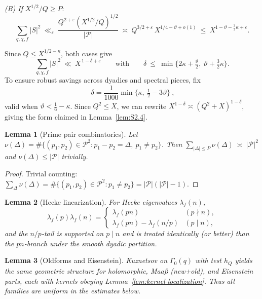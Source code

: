 \documentclass[11pt]{article}
\newtheorem{lemma}{Lemma}[part]
\theoremstyle{definition}
\theoremstyle{remark}
\numberwithin{equation}{part}
\begin{document}
\noindent\emph{(B) If } $X^{1/2}/Q\ge P$:
\[
	\sum_{q,\chi,f}|S|^2\ \ll_\varepsilon\ \frac{Q^{2+\varepsilon}(X^{1/2}/Q)^{1/2}}{|\mathcal P|}
	\ \asymp\ Q^{3/2+\varepsilon}\,X^{1/4-\vartheta+o(1)}
	\ \le\ X^{1-\vartheta-\tfrac{3}{2}\kappa+\varepsilon}.
\]

Since $Q\le X^{1/2-\kappa}$, both cases give
\[
	\sum_{q,\chi,f}|S|^2\ \ll\ X^{\,1-\delta+\varepsilon}
	\qquad\text{with}\qquad
	\delta\ \le\ \min\Big\{2\kappa+\tfrac{\vartheta}{2},\ \vartheta+\tfrac{3}{2}\kappa\Big\}.
\]
To ensure robust savings across dyadics and spectral pieces, fix
\[
	\boxed{\ \delta=\frac{1}{1000}\min\!\Big\{\kappa,\ \tfrac12-3\vartheta\Big\}\ },
\]
valid when $\vartheta<\tfrac16-\kappa$. Since $Q^2\le X$, we can rewrite $X^{1-\delta}\asymp(Q^2+X)^{1-\delta}$, giving the form claimed in Lemma~\ref{lem:S2.4}.


\begin{lemma}[Prime pair combinatorics]\label{lem:prime-pair}
	Let $\nu(\Delta)=\#\{(p_1,p_2)\in\mathcal P^2: p_1-p_2=\Delta,\ p_1\ne p_2\}$. Then
	\(
	\sum_{|\Delta|\le P}\nu(\Delta)\ \asymp\ |\mathcal P|^2
	\)
	and $\nu(\Delta)\le |\mathcal P|$ trivially.
\end{lemma}

\begin{proof}
	Trivial counting: $\sum_{\Delta}\nu(\Delta)=\#\{(p_1,p_2)\in\mathcal P^2: p_1\ne p_2\}=|\mathcal P|(|\mathcal P|-1)$.
\end{proof}

\begin{lemma}[Hecke linearization]\label{lem:hecke-linearization}
	For Hecke eigenvalues $\lambda_f(n)$,
	\[
		\lambda_f(p)\lambda_f(n)=
		\begin{cases}
			\lambda_f(pn)                & (p\nmid n), \\
			\lambda_f(pn)-\lambda_f(n/p) & (p\mid n),
		\end{cases}
	\]
	and the $n/p$-tail is supported on $p\mid n$ and is treated identically (or better) than the $pn$-branch under the smooth dyadic partition.
\end{lemma}

\begin{lemma}[Oldforms and Eisenstein]\label{lem:old-eis}
	Kuznetsov on $\Gamma_0(q)$ with test $h_Q$ yields the same geometric structure for holomorphic, Maaß (new+old), and Eisenstein parts, each with kernels obeying Lemma~\ref{lem:kernel-localization}. Thus all families are uniform in the estimates below.
\end{lemma}
\end{document}
